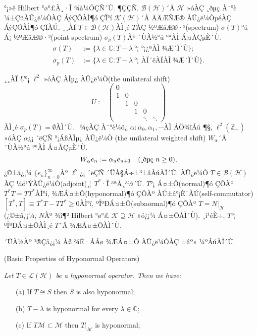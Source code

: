 \documentclass[12pt,a4paper,2sided]{article}
\newcommand{\vs}{\vspace}
\begin{document}

\vspace{.8 cm}

\noindent  °¡»ê Hilbert °ø°£À¸·Î ¾à¼ÓÇÑ´Ù. ¶ÇÇÑ, $\mathcal{B(H)}$´Â
$\mathcal{H}$ »óÀÇ ¸ðµç À¯°è ¼±ÇüÀÛ¿ë¼ÒÀÇ ÁýÇÕÀÌ¶ó ÇÏ°í
$\mathcal{K(H)}$´Â ÄÄÆÑÆ® ÀÛ¿ë¼ÒµéÀÇ ÁýÇÕÀÌ¶ó ÇÏÀÚ. ¸¸ÀÏ
$T\in\mathcal{B(H)}$ÀÌ¸é $T$ÀÇ ½ºÆåÆ®·³(spectrum) $\sigma(T)$°ú Á¡
½ºÆåÆ®·³(point spectrum) $\sigma_p(T)$Àº ´ÙÀ½°ú °°ÀÌ Á¤ÀÇµÈ´Ù.
\begin{align*}
\sigma(T)&:=\{\lambda\in\mathbb{C}: T-\lambda\ \text{°¡ °¡¿ªÀÌ ¾Æ´Ï´Ù}\};\\
\sigma_p(T)&:=\{\lambda\in\mathbb{C}: T-\lambda\ \text{°¡ ÀÏ´ëÀÏÀÌ ¾Æ´Ï´Ù}\}.
\end{align*}



¸¸ÀÏ $U$°¡ $\ell^2$ »óÀÇ ÀÌµ¿ ÀÛ¿ë¼Ò(the unilateral shift)
$$
U:=
\begin{pmatrix}
0\\
1&0\\
&1&0\\&&1&0\\&&&\ddots&\ddots
\end{pmatrix}
$$
ÀÌ¸é $\sigma_p(T)=\emptyset$ÀÌ´Ù. \ ¾çÀÇ À¯°è¼ö¿­
$\alpha:\alpha_0,\alpha_1,\cdots$ÀÌ ÁÖ¾îÁú ¶§,
$\ell^2(\mathbb{Z}_+)$ »óÀÇ $\alpha$¿¡ ´ëÇÑ °¡ÁßÀÌµ¿ ÀÛ¿ë¼Ò (the
unilateral weighted shift) $W_\alpha$´Â ´ÙÀ½°ú °°ÀÌ Á¤ÀÇµÈ´Ù.
$$
W_\alpha e_n:=\alpha_n e_{n+1}\quad \hbox{(¸ðµç $n\ge 0$)},
$$
¿©±â¿¡¼­ $\{e_n\}_{n=0}^\infty$Àº $\ell^2$¿¡ ´ëÇÑ
´ÜÀ§Á÷±³±âÀúÀÌ´Ù. ÀÛ¿ë¼Ò $T\in\mathcal{B(H)}$ÀÇ
¼ö¹ÝÀÛ¿ë¼Ò(adjoint)¸¦ $T^*$·Î ³ªÅ¸³½´Ù. $T$°¡ Á¤±Ô(normal)¶ó ÇÔÀº
$T^*T=TT^*$ÀÌ°í, ¾ÆÁ¤±Ô(hyponormal)¶ó ÇÔÀº
ÀÚ±â°¡È¯ÀÚ(self-commutator) $[T^*,T]\equiv T^*T-TT^*\ge 0$ÀÌ°í,
ºÎºÐÁ¤±Ô(subnormal)¶ó ÇÔÀº $T=N\vert_{\mathcal{H}}$ (¿©±â¿¡¼­,
$N$Àº ¾î¶² Hilbert °ø°£ $\mathcal{K}\supseteq \mathcal{H}$ »ó¿¡¼­
Á¤±ÔÀÌ´Ù). ¸í¹éÈ÷, $T$°¡ ºÎºÐÁ¤±ÔÀÌ¸é $T$´Â ¾ÆÁ¤±ÔÀÌ´Ù.

´ÙÀ½Àº ¹®Çå¿¡¼­ Àß ¾Ë·ÁÁø ¾ÆÁ¤±Ô ÀÛ¿ë¼ÒÀÇ ±âº» ¼ºÁúÀÌ´Ù.

\vs{0.3cm}{\bf Proposition 2.0.1.} {\rm (Basic Properties of
Hyponormal Operators)\cite{Con2}}\label{pro3.4} {\sl Let
$T\in\mathcal{L(H)}$ be a hyponormal operator. Then we have:
\begin{itemize}
\item[\rm(a)] If $T\cong S$ then $S$ is also hyponormal;

\item[\rm(b)] $T-\lambda$ is hyponormal for every
$\lambda\in\mathbb{C}$;

\item[\rm(c)] If $T\mathcal{M}\subset\mathcal{M}$ then
$T\vert_\mathcal{M}$ is hyponormal; \end{itemize}}
\end{document}

